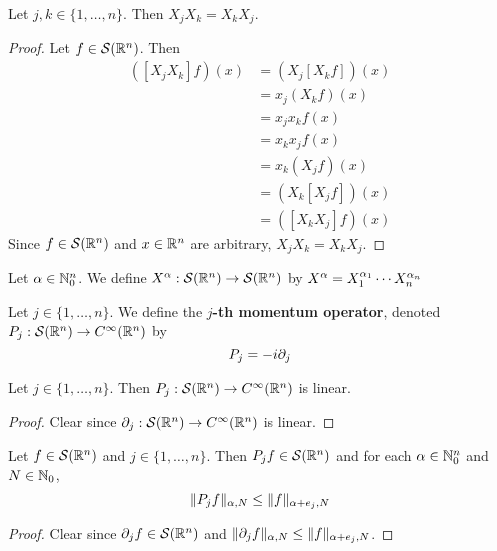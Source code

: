 \documentclass{book}
\begin{document}
	\begin{ex}
		Let $j,k \in \{1, \ldots, n\}$. Then $X_jX_k = X_kX_j$.
	\end{ex}
	
	\begin{proof}
		Let $f \in \mathcal{S}(\mathbb{R}^n)$. Then  
		\begin{align*}
			([X_jX_k] f) (x) 
			& = (X_j [X_k f]) (x) \\
			& = x_j (X_kf) (x) \\
			& = x_j x_k f(x) \\
			& = x_k x_j f(x) \\
			& = x_k (X_j f) (x) \\
			& = (X_k [X_j f]) (x) \\
			& = ([X_k X_j] f)(x)
		\end{align*}
		Since $f \in \mathcal{S}(\mathbb{R}^n)$ and $x \in \mathbb{R}^n$ are arbitrary, $X_jX_k = X_kX_j$. 
	\end{proof}
	
	\begin{defn}
		Let $\alpha \in \mathbb{N}_0^n$. We define $X^{\alpha}: \mathcal{S}(\mathbb{R}^n) \rightarrow \mathcal{S}(\mathbb{R}^n)$ by 
		$X^{\alpha} = X_1^{\alpha_1} \cdots X_n^{\alpha_n}$ 
	\end{defn}

	\begin{defn}
		Let $j \in \{1, \ldots, n\}$. We define the \textbf{$j$-th momentum operator}, denoted $P_j: \mathcal{S}(\mathbb{R}^n) \rightarrow C^{\infty}(\mathbb{R}^n)$ by 
		$$P_j = -i \partial_j $$
	\end{defn}

	\begin{ex}
		Let $j \in \{1, \ldots, n\}$. Then $P_j: \mathcal{S}(\mathbb{R}^n) \rightarrow C^{\infty}(\mathbb{R}^n)$ is linear. 
	\end{ex}

	\begin{proof}
		Clear since $\partial_j: \mathcal{S}(\mathbb{R}^n) \rightarrow C^{\infty}(\mathbb{R}^n)$ is linear.
	\end{proof}

	\begin{ex}
		Let $f \in \mathcal{S}(\mathbb{R}^n)$ and $j \in \{1, \ldots, n\}$. Then $P_jf \in \mathcal{S}(\mathbb{R}^n)$ and for each $\alpha \in \mathbb{N}_0^n$ and $N \in \mathbb{N}_0$, 
		\[
		\|P_jf \|_{\alpha, N} \leq \|f\|_{\alpha + e_j, N}
		\] 
	\end{ex}
	
	\begin{proof}
		Clear since $\partial_j f \in \mathcal{S}(\mathbb{R}^n)$ and $\|\partial_jf \|_{\alpha, N} \leq \|f\|_{\alpha + e_j, N}$.
	\end{proof}
\end{document}
